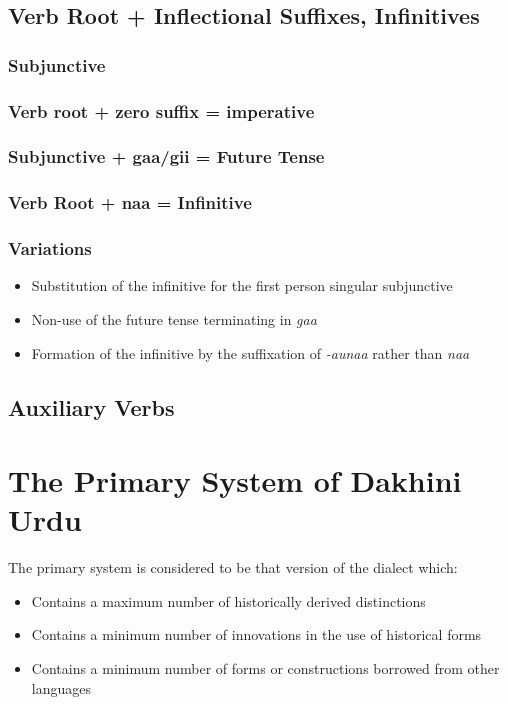 \documentclass[a4paper]{article}
\begin{document}
\subsection{Verb Root + Inflectional Suffixes, Infinitives}

\subsubsection{Subjunctive}
\subsubsection{Verb root + zero suffix = imperative}
\subsubsection{Subjunctive + gaa/gii = Future Tense}
\subsubsection{Verb Root + naa = Infinitive}

\subsubsection{Variations}

\begin{itemize}
\item
Substitution of the infinitive for the first person singular subjunctive
\item
Non-use of the future tense terminating in \textit{gaa}
\item
Formation of the infinitive by the suffixation of \textit{-aunaa} rather than \textit{naa}
\end{itemize}

\subsection{Auxiliary Verbs}

\section{The Primary System of Dakhini Urdu}

The primary system is considered to be that version of the dialect which:

\begin{itemize}
\item
Contains a maximum number of historically derived distinctions
\item
Contains a minimum number of innovations in the use of historical forms
\item
Contains a minimum number of forms or constructions borrowed from other languages
\end{itemize}
\end{document}
